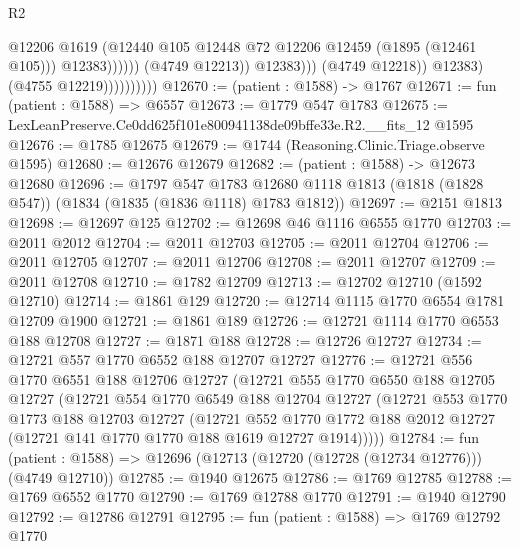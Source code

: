 \begin{lexlean}{R2}
\begin{coremodule}
                                              @12206
                                              @1619
                                              (@12440
                                                @105
                                                @12448
                                                @72
                                                @12206
                                                @12459
                                                (@1895 (@12461 @105)))
                                              @12383))))))
                                  (@4749 @12213))
                                @12383)))
                          (@4749 @12218))
                        @12383)
                      (@4755 @12219))))))))))
@12670 := (patient : @1588) -> @1767
@12671 := fun (patient : @1588) => @6557
@12673 := @1779 @547 @1783
@12675 := LexLeanPreserve.Ce0dd625f101e800941138de09bffe33e.R2.__fits_12 @1595
@12676 := @1785 @12675
@12679 := @1744 (Reasoning.Clinic.Triage.observe @1595)
@12680 := @12676 @12679
@12682 := (patient : @1588) -> @12673 @12680
@12696 := @1797
    @547
    @1783
    @12680
    @1118
    @1813
    (@1818 (@1828 @547))
    (@1834 (@1835 (@1836 @1118) @1783 @1812))
@12697 := @2151 @1813
@12698 := @12697 @125
@12702 := @12698 @46 @1116 @6555 @1770
@12703 := @2011 @2012
@12704 := @2011 @12703
@12705 := @2011 @12704
@12706 := @2011 @12705
@12707 := @2011 @12706
@12708 := @2011 @12707
@12709 := @2011 @12708
@12710 := @1782 @12709
@12713 := @12702 @12710 (@1592 @12710)
@12714 := @1861 @129
@12720 := @12714 @1115 @1770 @6554 @1781 @12709 @1900
@12721 := @1861 @189
@12726 := @12721 @1114 @1770 @6553 @188 @12708
@12727 := @1871 @188
@12728 := @12726 @12727
@12734 := @12721 @557 @1770 @6552 @188 @12707 @12727
@12776 := @12721
    @556
    @1770
    @6551
    @188
    @12706
    @12727
    (@12721
      @555
      @1770
      @6550
      @188
      @12705
      @12727
      (@12721
        @554
        @1770
        @6549
        @188
        @12704
        @12727
        (@12721
          @553
          @1770
          @1773
          @188
          @12703
          @12727
          (@12721
            @552
            @1770
            @1772
            @188
            @2012
            @12727
            (@12721 @141 @1770 @1770 @188 @1619 @12727 @1914)))))
@12784 := fun (patient : @1588) => @12696 (@12713 (@12720 (@12728 (@12734 @12776))) (@4749 @12710))
@12785 := @1940 @12675
@12786 := @1769 @12785
@12788 := @1769 @6552 @1770
@12790 := @1769 @12788 @1770
@12791 := @1940 @12790
@12792 := @12786 @12791
@12795 := fun (patient : @1588) => @1769 @12792 @1770

\end{coremodule}
\end{lexlean}

